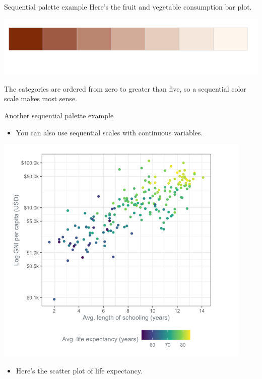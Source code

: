 \documentclass[
  ignorenonframetext,
]{beamer}
\providecommand{\tightlist}{%
  \setlength{\itemsep}{0pt}\setlength{\parskip}{0pt}}
\begin{document}
\begin{frame}{Sequential palette example}
\label{sequential-palette-example}
Here's the fruit and vegetable consumption bar plot.

\includegraphics{../images/im83.png}

The categories are ordered from zero to greater than five, so a
sequential color scale makes most sense.
\end{frame}

\begin{frame}{Another sequential palette example}
\label{another-sequential-palette-example}
\begin{itemize}
\tightlist
\item
  You can also use sequential scales with continuous variables.
\end{itemize}

\includegraphics{../images/im84.png}

\begin{itemize}
\tightlist
\item
  Here's the scatter plot of life expectancy.
\end{itemize}
\end{frame}
\end{document}
